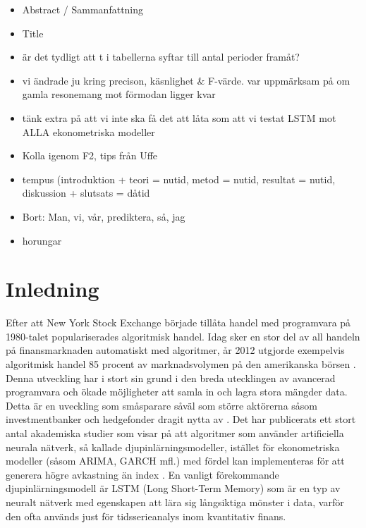 \documentclass[11pt]{article}
\numberwithin{equation}{section}
\numberwithin{table}{section}
\numberwithin{figure}{section}
\begin{document}
\newpage
\thispagestyle{empty}

\begin{itemize}
    \item Abstract / Sammanfattning
    \item Title 
    \item är det tydligt att t i tabellerna syftar till antal perioder framåt?
    \item vi ändrade ju kring precison, käsnlighet \& F-värde. var uppmärksam på om gamla resonemang mot förmodan ligger kvar
    \item tänk extra på att vi inte ska få det att låta som att vi testat LSTM mot ALLA ekonometriska modeller
    \item Kolla igenom F2, tips från Uffe
    
    \item tempus (introduktion + teori = nutid, metod = nutid, resultat = nutid,  diskussion + slutsats = dåtid
    \item Bort: Man, vi, vår, prediktera, så, jag
    \item horungar
\end{itemize}

\newpage
\clearpage
\setcounter{page}{1}


\section{Inledning}
Efter att New York Stock Exchange började tillåta handel med programvara på 1980-talet populariserades algoritmisk handel.  Idag sker en stor del av all handeln på finansmarknaden automatiskt med algoritmer, år 2012 utgjorde exempelvis algoritmisk handel 85 procent av marknadsvolymen på den amerikanska börsen \parencite[][,s.258]{glantz2013multi}. Denna utveckling har i stort sin grund i den breda utecklingen av avancerad programvara och ökade möjligheter att samla in och lagra stora mängder data. Detta är en uveckling som småsparare såväl som större aktörerna såsom investmentbanker och hedgefonder dragit nytta av \parencite{DE_Shaw}. Det har publicerats ett stort antal akademiska studier som visar på att algoritmer som använder artificiella neurala nätverk, så kallade djupinlärningsmodeller, istället för ekonometriska modeller (såsom ARIMA, GARCH mfl.) med fördel kan implementeras för att generera högre avkastning än index \parencite{paliwal2009neural}. En vanligt förekommande djupinlärningsmodell är LSTM (Long Short-Term Memory) som är en typ av neuralt nätverk med egenskapen att lära sig långsiktiga mönster i data, varför den ofta används just för tidsserieanalys inom kvantitativ finans.
\end{document}
